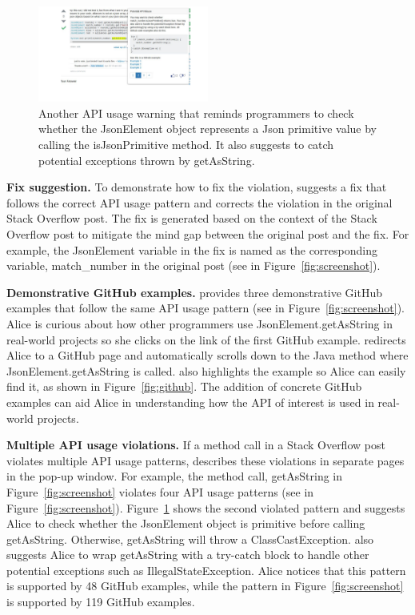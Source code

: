 \begin{figure}
\centering
\includegraphics[width=0.5\textwidth]{soap-v3-2.pdf}
  \vspace{.1in}
  \caption{Another API usage warning that reminds programmers to check whether the {\ttt JsonElement} object represents a Json primitive value by calling the {\ttt isJsonPrimitive} method. It also suggests to catch potential exceptions thrown by {\ttt getAsString}.}
  \label{fig:screenshot2}
\end{figure}

{\bf Fix suggestion.} To demonstrate how to fix the violation, {\tool} suggests a fix that follows the correct API usage pattern and corrects the violation in the original Stack Overflow post. The fix is generated based on the context of the Stack Overflow post to mitigate the mind gap between the original post and the fix. For example, the {\ttt JsonElement} variable in the fix is named as the corresponding variable, {\ttt match\_number} in the original post (see  in Figure~\ref{fig:screenshot}). 

{\bf Demonstrative GitHub examples.} {\tool} provides three demonstrative GitHub examples that follow the same API usage pattern (see  in Figure~\ref{fig:screenshot}). Alice is curious about how other programmers use {\ttt JsonElement.getAsString} in real-world projects so she clicks on the link of the first GitHub example. {\tool} redirects Alice to a GitHub page and automatically scrolls down to the Java method where {\ttt JsonElement.getAsString} is called. {\tool} also highlights the example so Alice can easily find it, as shown in Figure~\ref{fig:github}. The addition of concrete GitHub examples can aid Alice in understanding how the API of interest is used in real-world projects. 

{\bf Multiple API usage violations.} If a method call in a Stack Overflow post violates multiple API usage patterns, {\tool} describes these violations in separate pages in the pop-up window. For example, the method call, {\ttt getAsString} in Figure~\ref{fig:screenshot} violates four API usage patterns (see  in Figure~\ref{fig:screenshot}). Figure~\ref{fig:screenshot2} shows the second violated pattern and suggests Alice to check whether the {\ttt JsonElement} object is primitive before calling {\ttt getAsString}. Otherwise, {\ttt getAsString} will throw a {\ttt ClassCastException}. {\tool} also suggests Alice to wrap {\ttt getAsString} with a try-catch block to handle other potential exceptions such as {\ttt IllegalStateException}. Alice notices that this pattern is supported by 48 GitHub examples, while the pattern in Figure~\ref{fig:screenshot} is supported by 119 GitHub examples.


